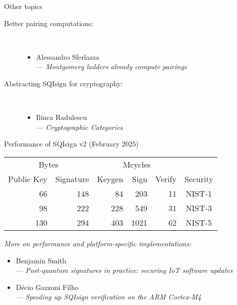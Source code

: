 \documentclass[aspectratio=169]{beamer}
\begin{document}
\begin{frame}{Other topics}
  \begin{description}
  \item[Better pairing computations:]\
    \begin{itemize}
    \item Alessandro Sferlazza\\
      --- \textit{Montgomery ladders already compute pairings}
    \end{itemize}
  \item[Abstracting SQIsign for cryptography:]\
    \begin{itemize}
    \item Ilinca Radulescu\\
      --- \textit{Cryptographic Categories}
    \end{itemize}
  \end{description}
\end{frame}


\begin{frame}{Performance of SQIsign v2 \small(February 2025)}
  \begin{table}[h]
    \centering
    \begin{tabular}{ r r | r r r | c }
      \multicolumn{2}{c|}{Bytes} & \multicolumn{3}{c|}{Mcycles}\\
      Public Key & Signature & Keygen & Sign & Verify & Security \\
      \hline
      66 & 148 & 84 & 203 & 11 & NIST-1 \\
      98 & 222 & 228 & 549 & 31 & NIST-3 \\
      130 & 294 & 403 & 1021 & 62 & NIST-5 \\
    \end{tabular}
  \end{table}

  \bigskip
  \emph{More on performance and platform-specific implementations:}
  \begin{itemize}
  \item Benjamin Smith\\
    --- \textit{Post-quantum signatures in practice: securing IoT software updates}
  \item Décio Gazzoni Filho\\
    --- \textit{Speeding up SQIsign verification on the ARM Cortex-M4}
  \end{itemize}
\end{frame}
\end{document}
